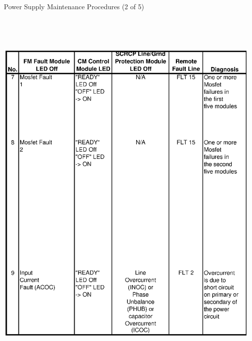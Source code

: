 \clearpage
\begin{table}
\caption{Power Supply Maintenance Procedures (2 of 5) \label{tab:ps_maint_2}}
\includegraphics[height=7.5in,width=6.2in]{spectrometers/book2.ps}
\end{table}


